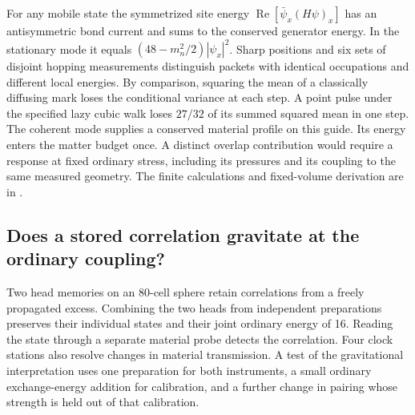 \documentclass[11pt]{article}
\begin{document}
For any mobile state the symmetrized site energy
$\operatorname{Re}[\bar\psi_x(H\psi)_x]$ has an antisymmetric bond
current and sums to the conserved generator energy. In the stationary
mode it equals $(48-m_n^2/2)|\psi_x|^2$. Sharp positions and six
sets of disjoint hopping measurements distinguish packets with
identical occupations and different local energies. By comparison,
squaring the mean of a classically diffusing mark loses the
conditional variance at each step. A point pulse under the specified
lazy cubic walk loses $27/32$ of its summed squared mean in one step.
The coherent mode supplies a conserved material profile on this
guide. Its energy enters the matter budget once. A distinct overlap
contribution would require a response at fixed ordinary stress,
including its pressures and its coupling to the same measured geometry.
The finite calculations and fixed-volume derivation are in
.

\subsection{Does a stored correlation gravitate at the ordinary coupling?}
Two head memories on an 80-cell sphere retain correlations from a
freely propagated excess. Combining the two heads from independent
preparations preserves their individual states and their joint
ordinary energy of 16. Reading the state through a separate material
probe detects the correlation. Four clock stations also resolve
changes in material transmission. A test of the gravitational
interpretation uses one preparation for both instruments, a small
ordinary exchange-energy addition for calibration, and a further
change in pairing whose strength is held out of that calibration.
\end{document}
